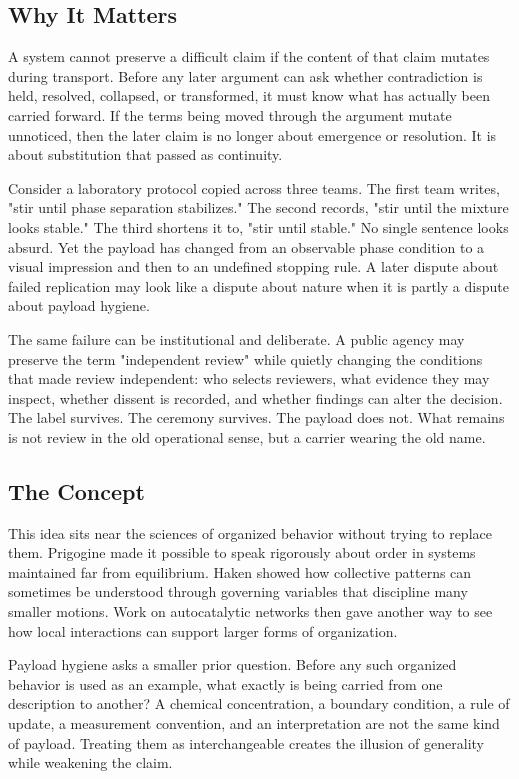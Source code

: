 \documentclass[11pt,a4paper,openany]{book}
\begin{document}
\subsection{Why It Matters}
A system cannot preserve a difficult claim if the content of that claim mutates during transport. Before any later argument can ask whether contradiction is held, resolved, collapsed, or transformed, it must know what has actually been carried forward. If the terms being moved through the argument mutate unnoticed, then the later claim is no longer about emergence or resolution. It is about substitution that passed as continuity. \cite{prigogine_dissipative,haken_synergetics}\par
Consider a laboratory protocol copied across three teams. The first team writes, "stir until phase separation stabilizes." The second records, "stir until the mixture looks stable." The third shortens it to, "stir until stable." No single sentence looks absurd. Yet the payload has changed from an observable phase condition to a visual impression and then to an undefined stopping rule. A later dispute about failed replication may look like a dispute about nature when it is partly a dispute about payload hygiene.\par
The same failure can be institutional and deliberate. A public agency may preserve the term "independent review" while quietly changing the conditions that made review independent: who selects reviewers, what evidence they may inspect, whether dissent is recorded, and whether findings can alter the decision. The label survives. The ceremony survives. The payload does not. What remains is not review in the old operational sense, but a carrier wearing the old name.\par
\subsection{The Concept}
This idea sits near the sciences of organized behavior without trying to replace them. Prigogine made it possible to speak rigorously about order in systems maintained far from equilibrium. Haken showed how collective patterns can sometimes be understood through governing variables that discipline many smaller motions. Work on autocatalytic networks then gave another way to see how local interactions can support larger forms of organization. \cite{prigogine_dissipative,haken_synergetics}\par
Payload hygiene asks a smaller prior question. Before any such organized behavior is used as an example, what exactly is being carried from one description to another? A chemical concentration, a boundary condition, a rule of update, a measurement convention, and an interpretation are not the same kind of payload. Treating them as interchangeable creates the illusion of generality while weakening the claim.\par
\end{document}
